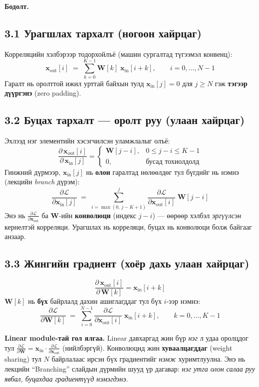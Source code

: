 \documentclass[11pt]{article}
\newenvironment{solution}[1][\textbf{Бодолт.}]
    { \noindent #1 \smallskip \\ }
    { \medskip }
\newcommand{\xin}{\mathbf{x}_{\mathrm{in}}}
\newcommand{\xout}{\mathbf{x}_{\mathrm{out}}}
\newcommand{\dL}[1]{\frac{\partial \mathcal{L}}{\partial #1}}
\begin{document}
\begin{solution}
\subsection*{3.1 Урагшлах тархалт (ногоон хайрцаг)}
Корреляцийн хэлбэрээр тодорхойлъё (машин сургалтад түгээмэл конвенц):
\begin{equation}
\boxed{\;\xout[i] \;=\; \sum_{k=0}^{K-1} \mathbf{W}[k]\;\xin[i+k], \qquad i = 0,\dots,N-1\;}
\end{equation}
Гаралт нь оролттой ижил урттай байхын тулд $\xin[j] = 0$ для $j \ge N$ гэж
\textbf{тэгээр дүүргэнэ} (zero padding).

\subsection*{3.2 Буцах тархалт — оролт руу (улаан хайрцаг)}
Эхлээд нэг элементийн хэсэгчилсэн уламжлалыг олъё:
\[
\frac{\partial\, \xout[i]}{\partial\, \xin[j]} =
\begin{cases}
\mathbf{W}[j-i], & 0 \le j-i \le K-1 \\[2pt]
0, & \text{бусад тохиолдолд}
\end{cases}
\]
Гинжний дүрмээр, $\xin[j]$ нь \textbf{олон} гаралтад нөлөөлдөг тул бүгдийг нь нэмнэ
(лекцийн \emph{branch} дүрэм):
\begin{equation}
\boxed{\;\dL{\xin[j]} \;=\; \sum_{i=\max(0,\,j-K+1)}^{j} \dL{\xout[i]}\;\mathbf{W}[j-i]\;}
\end{equation}
Энэ нь $\dL{\xout}$ ба $\mathbf{W}$-ийн \textbf{конволюци} (индекс $j-i$) —
өөрөөр хэлбэл \emph{эргүүлсэн} кернелтэй корреляци. Урагшлах нь корреляци, буцах нь
конволюци болж байгааг анзаар.

\subsection*{3.3 Жингийн градиент (хоёр дахь улаан хайрцаг)}
\[
\frac{\partial\, \xout[i]}{\partial\, \mathbf{W}[k]} = \xin[i+k]
\]
$\mathbf{W}[k]$ нь \textbf{бүх} байрлалд дахин ашиглагддаг тул бүх $i$-ээр нэмнэ:
\begin{equation}
\boxed{\;\dL{\mathbf{W}[k]} \;=\; \sum_{i=0}^{N-1} \dL{\xout[i]}\;\xin[i+k],
\qquad k = 0,\dots,K-1\;}
\end{equation}

\begin{mdframed}[backgroundcolor=yellow!12]
\textbf{Linear module-тай гол ялгаа.} Linear давхаргад жин бүр \emph{нэг} л удаа
оролцдог тул $\dL{\mathbf{W}} = \xin \cdot \dL{\xout}$ (нийлбэргүй). Конволюцид жин
\textbf{хуваалцагддаг} (weight sharing) тул $N$ байрлалаас ирсэн бүх градиентийг
\emph{нэмж} хуримтлуулна. Энэ нь лекцийн ``Branching'' слайдын дүрмийн шууд үр дагавар:
\emph{нэг утга олон салаа руу явбал, буцахдаа градиентүүд нэмэгдэнэ}.
\end{mdframed}


\end{solution}
\end{document}

